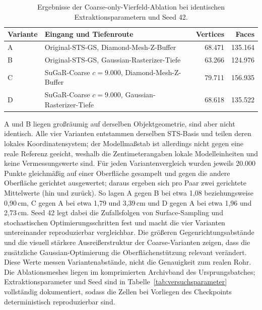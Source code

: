 \begin{table}[H]
\centering
\small
\begin{tabularx}{\textwidth}{lXrr}
\toprule
Variante & Eingang und Tiefenroute & Vertices & Faces\\
\midrule
A & Original-STS-GS, Diamond-Mesh-Z-Buffer & 68.471 & 135.164\\
B & Original-STS-GS, Gaussian-Rasterizer-Tiefe & 63.266 & 124.976\\
C & SuGaR-Coarse $c=9.000$, Diamond-Mesh-Z-Buffer & 79.711 & 156.935\\
D & SuGaR-Coarse $c=9.000$, Gaussian-Rasterizer-Tiefe & 68.618 & 135.522\\
\bottomrule
\end{tabularx}
\caption{Ergebnisse der Coarse-only-Vierfeld-Ablation bei identischen
Extraktionsparametern und Seed 42.}
\label{tab:mesh-ablation}
\end{table}

A und B liegen großräumig auf derselben Objektgeometrie, sind aber nicht
identisch. Alle vier Varianten entstammen derselben STS-Basis und teilen
deren lokales Koordinatensystem; der Modellmaßstab ist allerdings nicht gegen
eine reale Referenz geeicht, weshalb die Zentimeterangaben lokale
Modelleinheiten und keine Vermessungswerte sind. Für jeden Variantenvergleich
wurden jeweils 20.000 Punkte gleichmäßig auf einer Oberfläche gesampelt und
gegen die andere Oberfläche gerichtet ausgewertet; daraus ergeben sich pro
Paar zwei gerichtete Mittelwerte (hin und zurück). So lagen A gegen B bei
etwa 1,08 beziehungsweise 0,90\,cm, C gegen A bei etwa 1,79 und 3,39\,cm und
D gegen A bei etwa 1,96 und 2,73\,cm. Seed 42 legt dabei die Zufallsfolgen
von Surface-Sampling und stochastischen Optimierungsschritten fest und macht
die vier Varianten untereinander reproduzierbar vergleichbar. Die größeren
Gegenrichtungsabstände und die visuell stärkere Ausreißerstruktur der
Coarse-Varianten zeigen, dass die zusätzliche Gaussian-Optimierung die
Oberflächenstützung relevant verändert. Diese Werte messen Variantenabstände,
nicht die Genauigkeit zum realen Rohr. Die Ablationsmeshes liegen im
komprimierten Archivband des Ursprungsbatches; Extraktionsparameter und Seed
sind in Tabelle~\ref{tab:versuchsparameter} vollständig dokumentiert, sodass
die Zellen bei Vorliegen des Checkpoints deterministisch reproduzierbar sind.

